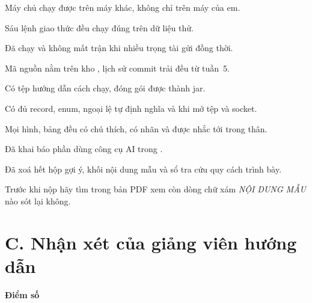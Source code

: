 \begin{tukiem}
  \item Máy chủ chạy được trên máy khác, không chỉ trên máy của em.
  \item Sáu lệnh giao thức đều chạy đúng trên dữ liệu thử.
  \item Đã chạy  và không mất trận khi nhiều trọng tài gửi
        đồng thời.
  \item Mã nguồn nằm trên kho , lịch sử commit trải đều từ tuần~5.
  \item Có tệp  hướng dẫn cách chạy, đóng gói được thành jar.
  \item Có đủ record, enum, ngoại lệ tự định nghĩa và 
        khi mở tệp và socket.
  \item Mọi hình, bảng đều có chú thích, có nhãn và được nhắc tới trong thân.
  \item Đã khai báo phần dùng công cụ AI trong .
  \item Đã xoá hết hộp gợi ý, khối nội dung mẫu và sổ tra cứu quy cách trình bày.
\end{tukiem}

\begin{luuy}
Trước khi nộp hãy tìm trong bản PDF xem còn dòng chữ xám \emph{NỘI DUNG MẪU}
nào sót lại không.
\end{luuy}

\section*{C. Nhận xét của giảng viên hướng dẫn}
{}

\khungnhanxet[7.5cm]

\vspace{0.8em}
\noindent\begin{minipage}[t]{0.5\textwidth}
\color{daunavy}
{\color{daumaroon}\bfseries Điểm số}

\vspace{0.7em}

\vspace{0.9em}
\end{minipage}\hfill
{}
